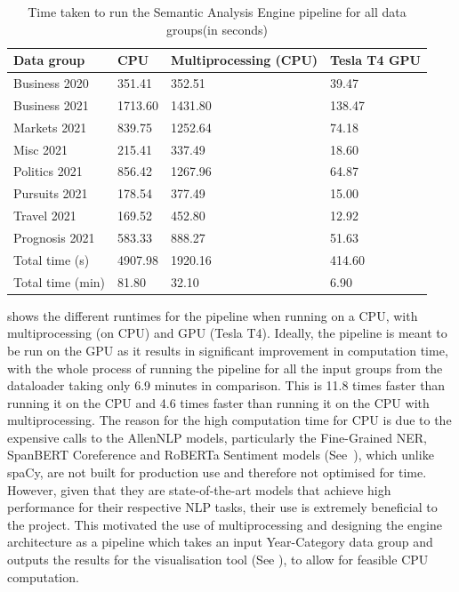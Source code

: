 \begin{table}[H] 
\centering
\renewcommand{\arraystretch}{1.05}
\begin{tabularx}{\textwidth}{X X X X} 
 \hline
Data group & CPU &  Multiprocessing (CPU) & Tesla T4 GPU \\
 \hline
 Business 2020  & 351.41  & 352.51  & 39.47 \\ 
 Business 2021  & 1713.60 & 1431.80 & 138.47 \\
 Markets 2021   & 839.75  & 1252.64 & 74.18\\
 Misc 2021      & 215.41  & 337.49  & 18.60 \\
 Politics 2021  & 856.42  & 1267.96 & 64.87 \\
 Pursuits 2021  & 178.54  & 377.49  & 15.00 \\ 
 Travel 2021    & 169.52  & 452.80  & 12.92 \\
 Prognosis 2021 & 583.33  & 888.27  & 51.63 \\ 
 \hline
 Total time (s) & 4907.98 & 1920.16 & 414.60 \\ 
 Total time (min) & 81.80  & 32.10 & 6.90\\ 
\end{tabularx}

\caption{Time taken to run the Semantic Analysis Engine pipeline for all data groups(in seconds)}
\label{table:cputime}
\end{table}
\vspace{-2em}
 shows the different runtimes for the pipeline when running on a CPU, with multiprocessing (on CPU) and GPU (Tesla T4). Ideally, the pipeline is meant to be run on the GPU as it results in significant improvement in computation time, with the whole process of running the pipeline for all the input groups from the dataloader taking only 6.9 minutes in comparison. This is 11.8 times faster than running it on the CPU and 4.6 times faster than running it on the CPU with multiprocessing. The reason for the high computation time for CPU is due to the expensive calls to the AllenNLP models, particularly the Fine-Grained NER, SpanBERT Coreference and RoBERTa Sentiment models (See~), which unlike spaCy, are not built for production use and therefore not optimised for time. However, given that they are state-of-the-art models that achieve high performance for their respective NLP tasks, their use is extremely beneficial to the project. This motivated the use of multiprocessing and designing the engine architecture as a pipeline which takes an input Year-Category data group and outputs the results for the visualisation tool (See ), to allow for feasible CPU computation. 

